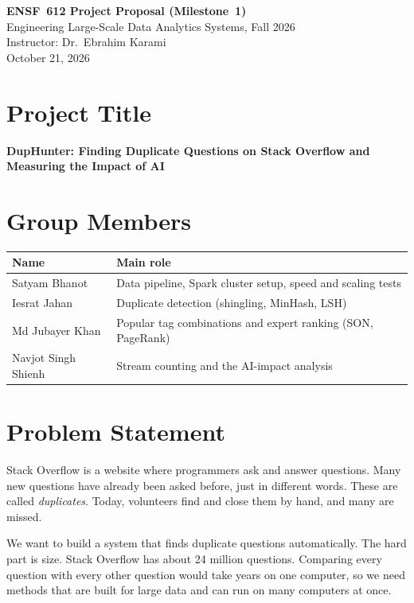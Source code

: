 \documentclass[11pt,a4paper]{article}
\begin{document}
\begin{center}
  {\Large\bfseries ENSF~612 Project Proposal (Milestone~1)}\\[3pt]
  {\small Engineering Large-Scale Data Analytics Systems, Fall 2026\\[1pt]
  Instructor: Dr.~Ebrahim Karami\\[1pt]
  October 21, 2026}
\end{center}

\section{Project Title}
\textbf{DupHunter: Finding Duplicate Questions on Stack Overflow and Measuring
the Impact of AI}

\section{Group Members}
{\small
\begin{tabularx}{\textwidth}{@{}l Y@{}}
\toprule
\textbf{Name} & \textbf{Main role} \\
\midrule
Satyam Bhanot       & Data pipeline, Spark cluster setup, speed and scaling tests \\
Iesrat Jahan        & Duplicate detection (shingling, MinHash, LSH) \\
Md Jubayer Khan     & Popular tag combinations and expert ranking (SON, PageRank) \\
Navjot Singh Shienh & Stream counting and the AI-impact analysis \\
\bottomrule
\end{tabularx}}

\section{Problem Statement}

Stack Overflow is a website where programmers ask and answer questions. Many
new questions have already been asked before, just in different words. These
are called \emph{duplicates}. Today, volunteers find and close them by hand,
and many are missed.

We want to build a system that finds duplicate questions automatically. The
hard part is size. Stack Overflow has about 24 million questions. Comparing
every question with every other question would take years on one computer, so
we need methods that are built for large data and can run on many computers at
once.
\end{document}

